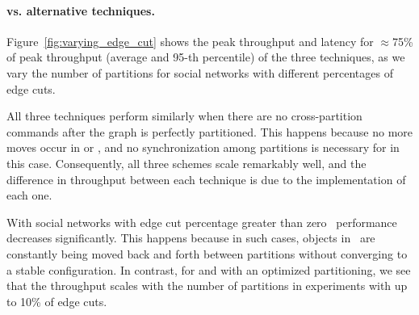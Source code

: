 

\paragraph*{\dynastar vs. alternative techniques.}
\label{sec:evaluation:results}

Figure~\ref{fig:varying_edge_cut} shows the peak throughput and latency for $\approx$75\% of peak throughput (average and 95-th percentile) of the three techniques, 
as we vary the number of partitions for social networks with different percentages of edge cuts.

All three techniques perform similarly when there are no cross-partition commands after
the graph is perfectly partitioned. This happens because no more moves occur in
\dynastar or \dssmr, and no synchronization among partitions is
necessary for \ssmr in this case. 
Consequently, all three schemes scale remarkably well, and
the difference in throughput between each technique is due to the implementation of each one.

With social networks with edge cut percentage greater than zero \dssmr\ performance decreases significantly.  
This happens because in such cases, objects in \dssmr\ are constantly being moved back and forth between partitions 
without converging to a stable configuration.
In contrast, for \dynastar and \ssmr with an optimized partitioning, we see that the throughput scales with the number of partitions in experiments with up to 10\% of edge cuts. 



